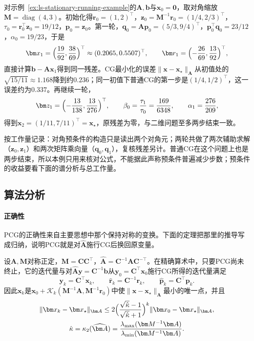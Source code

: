 \begin{example}[贯穿例上的PCG]
\label{ex:ls-pcg-one-step}
对示例~\ref{ex:ls-stationary-running-example}的$\bm A,\bm b$与$\bm x_0=\bm0$，取对角缩放$\bm M=\operatorname{diag}(4,3)$。初始化得$\bm r_0=(1,2)^\top$，$\bm z_0=\bm M^{-1}\bm r_0=(1/4,2/3)^\top$，$\tau_0=\bm r_0^\top\bm z_0=19/12$，$\bm p_0=\bm z_0$。第一轮，$\bm q_0=\bm A\bm p_0=(5/3,9/4)^\top$，$\bm p_0^\top\bm q_0=23/12$，$\alpha_0=19/23$，于是
\[
 \bm x_1=\Bigl(\frac{19}{92},\frac{38}{69}\Bigr)^\top\approx(0.2065,0.5507)^\top,\qquad
 \bm r_1=\Bigl(-\frac{26}{69},\frac{13}{92}\Bigr)^\top ,
\]
直接计算$\bm b-\bm A\bm x_1$得到同一残差。CG最小化的误差$\lVert\bm x-\bm x_\star\rVert_{\bm A}$从初值处的$\sqrt{15/11}\approx1.168$降到约$0.236$；同一初值下普通CG的第一步是$(1/4,1/2)^\top$，这一误差约为$0.337$。再继续一轮，
\[
 \bm z_1=\Bigl(-\frac{13}{138},\frac{13}{276}\Bigr)^\top,\qquad
 \beta_0=\frac{\tau_1}{\tau_0}=\frac{169}{6348},\qquad
 \alpha_1=\frac{276}{209},
\]
得到$\bm x_2=(1/11,7/11)^\top=\bm x_\star$，原残差为零，与二维问题至多两步结束一致。

按工作量记录：对角预条件的构造只是读出两个对角元；两轮共做了两次辅助求解（$\bm z_0,\bm z_1$）和两次矩阵乘向量（$\bm q_0,\bm q_1$），复核残差另计。普通CG在这个问题上也是两步结束，所以本例只用来核对公式，不能据此声称预条件普遍减少步数；预条件的收益要看下面的谱分析与总工作量。
\end{example}

\subsection{算法分析}

\paragraph{正确性}
PCG的正确性来自主要思想中那个保持对称的变换。下面的定理把那里的推导写成归纳，说明PCG就是对$\widehat{\bm A}$施行CG后换回原变量。

\begin{theorem}[PCG与变换后CG的等价]
\label{thm:ls-pcg-equivalence}
设$\bm A,\bm M$对称正定，$\bm M=\bm C\bm C^\top$，$\widehat{\bm A}=\bm C^{-1}\bm A\bm C^{-\top}$。在精确算术中，只要PCG尚未终止，它的迭代量与对$\widehat{\bm A}\bm y=\bm C^{-1}\bm b$从$\bm y_0=\bm C^\top\bm x_0$施行CG所得的迭代量满足
\[
 \bm y_k=\bm C^\top\bm x_k,\qquad \hat{\bm r}_k=\bm C^{-1}\bm r_k,\qquad \hat{\bm p}_k=\bm C^\top\bm p_k .
\]
因此$\bm x_k$是$\bm x_0+\mathcal K_k(\bm M^{-1}\bm A,\bm M^{-1}\bm r_0)$中使$\lVert\bm x-\bm x_\star\rVert_{\bm A}$最小的唯一点，并且
\[
 \begin{gathered}
 \lVert\bm x_k-\bm x_\star\rVert_{\bm A}\le2\Bigl(\frac{\sqrt{\hat\kappa}-1}{\sqrt{\hat\kappa}+1}\Bigr)^k\lVert\bm x_0-\bm x_\star\rVert_{\bm A},\\
 \hat\kappa=\kappa_2(\widehat{\bm A})=\frac{\lambda_{\max}(\bm M^{-1}\bm A)}{\lambda_{\min}(\bm M^{-1}\bm A)} .
 \end{gathered}
\]
\end{theorem}

